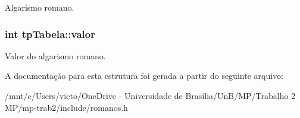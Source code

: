 Algarismo romano. 

\hypertarget{structtpTabela_aa41caf7726025b8cab7eade2dc835874}{
\subsubsection[{valor}]{\setlength{\rightskip}{0pt plus 5cm}int tp\-Tabela\-::valor}}\label{structtpTabela_aa41caf7726025b8cab7eade2dc835874}


Valor do algarismo romano. 



A documentação para esta estrutura foi gerada a partir do seguinte arquivo\-:\begin{DoxyCompactItemize}
\item 
/mnt/c/\-Users/victo/\-One\-Drive -\/ Universidade de Brasília/\-Un\-B/\-M\-P/\-Trabalho 2 M\-P/mp-\/trab2/include/romanos.\-h\end{DoxyCompactItemize}
